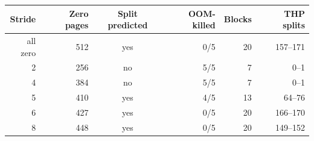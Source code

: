 \begin{tabular}{rrcrrr}
\toprule
Stride & Zero pages & Split predicted & OOM-killed & Blocks & THP splits \\
\midrule
all zero & 512 & yes & 0/5 & 20 & 157--171 \\
2 & 256 & no & 5/5 & 7 & 0--1 \\
4 & 384 & no & 5/5 & 7 & 0--1 \\
5 & 410 & yes & 4/5 & 13 & 64--76 \\
6 & 427 & yes & 0/5 & 20 & 166--170 \\
8 & 448 & yes & 0/5 & 20 & 149--152 \\
\bottomrule
\end{tabular}
